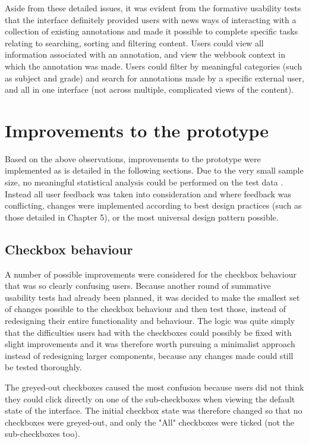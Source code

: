 Aside from these detailed issues, it was evident from the formative usability tests that the interface definitely provided users with news ways of interacting with a collection of existing annotations and made it possible to complete specific tasks relating to searching, sorting and filtering content. Users could view all information associated with an annotation, and view the webbook context in which the annotation was made. Users could filter by meaningful categories (such as subject and grade) and search for annotations made by a specific external user, and all in one interface (not across multiple, complicated views of the content).


\section{Improvements to the prototype}
Based on the above observations, improvements to the prototype were implemented as is detailed in the following sections. Due to the very small sample size, no meaningful statistical analysis could be performed on the test data \citep[p. 149]{Hartson}. Instead all user feedback was taken into consideration and where feedback was conflicting, changes were implemented according to best design practices (such as those detailed in Chapter 5), or the most universal design pattern possible.
\subsection{Checkbox behaviour}
A number of possible improvements were considered for the checkbox behaviour that was so clearly confusing users. Because another round of summative usability tests had already been planned, it was decided to make the smallest set of changes possible to the checkbox behaviour and then test those, instead of redesigning their entire functionality and behaviour. The logic was quite simply that the difficulties users had with the checkboxes could possibly be fixed with slight improvements and it was therefore worth pursuing a minimalist approach instead of redesigning larger components,  because any changes made could still be tested thoroughly.

The greyed-out checkboxes caused the most confusion because users did not think they could click directly on one of the sub-checkboxes when viewing the default state of the interface. The initial checkbox state was therefore changed so that no checkboxes were greyed-out, and only the "All" checkboxes were ticked (not the sub-checkboxes too).  

